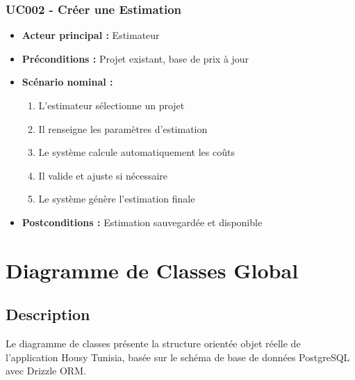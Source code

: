 \subsubsection{UC002 - Créer une Estimation}

\begin{itemize}
    \item \textbf{Acteur principal :} Estimateur
    \item \textbf{Préconditions :} Projet existant, base de prix à jour
    \item \textbf{Scénario nominal :}
    \begin{enumerate}
        \item L'estimateur sélectionne un projet
        \item Il renseigne les paramètres d'estimation
        \item Le système calcule automatiquement les coûts
        \item Il valide et ajuste si nécessaire
        \item Le système génère l'estimation finale
    \end{enumerate}
    \item \textbf{Postconditions :} Estimation sauvegardée et disponible
\end{itemize}

\section{Diagramme de Classes Global}

\subsection{Description}

Le diagramme de classes présente la structure orientée objet réelle de l'application Housy Tunisia, basée sur le schéma de base de données PostgreSQL avec Drizzle ORM.

